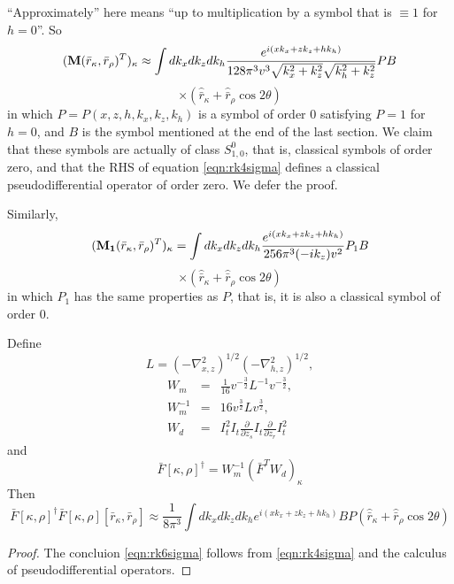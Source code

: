 ``Approximately'' here means ``up to multiplication by a symbol that
is $\equiv 1$ for $h=0$''. So 
\[
({\bf M}(\bar{r}_{\kappa},\bar{r}_{\rho})^T)_{\kappa} 
\approx \int dk_x dk_z dk_h \frac{e^{i(xk_{x}+zk_{z}+hk_{h})} }{128 \pi^3 v^3 \sqrt{k_x^2+k_z^2}\sqrt{k_h^2+k_z^2}}PB 
\]
\begin{equation}
\label{eqn:rk4sigma}
\times 
(\hat{\bar{r}}_{\kappa} + \hat{\bar{r}}_{\rho} \cos 2 \theta ) 
\end{equation}
in which $P=P(x,z,h,k_x,k_z,k_h)$ is a symbol of order 0 satisfying
$P=1$ for $h=0$, and $B$ is the symbol mentioned at the end of the
last section. We claim that these symbols are actually of class
$S^0_{1,0}$, that is, classical symbols of order zero, and that the
RHS of equation \ref{eqn:rk4sigma} defines a classical
pseudodifferential operator of order zero. We defer the proof.

Similarly,
\[
({\bf M_1}(\bar{r}_{\kappa},\bar{r}_{\rho})^T)_{\kappa} 
= \int dk_x dk_z dk_h \frac{e^{i(xk_{x}+zk_{z}+hk_{h})} }{256 \pi^3 (-ik_z)v^2}P_1B 
\]
\begin{equation}
\label{eqn:rk4sigmabis}
\times 
(\hat{\bar{r}}_{\kappa} + \hat{\bar{r}}_{\rho} \cos 2 \theta ) 
\end{equation}
in which $P_1$ has the same properties as $P$, that is, it is also a
classical symbol of order 0. 

\begin{theorem}
Define
\begin{equation}
\label{eqn:defL}
L=(-\nabla^2_{x,z})^{1/2}(-\nabla^2_{h,z})^{1/2},
\end{equation}
\begin{eqnarray}
\label{eqn:defWm}
W_m & = & \frac{1}{16}v^{-\frac{3}{2}}L^{-1}v^{-\frac{3}{2}},\\
\label{eqn:defWminv}
W_m^{-1} & = & 16 v^{\frac{3}{2}}Lv^{\frac{3}{2}},\\
\label{eqn:defWd}
W_d &=& I_t^2 I_t\frac{\partial}{\partial z_s}I_t\frac{\partial}{\partial z_r}I_t^2
\end{eqnarray}
and 
\begin{equation}
\label{eqn:rk5sigma} 
\bar{F}[\kappa,\rho]^{\dagger}  = W_m^{-1} (\bar{F}^T W_d)_{\kappa} 
\end{equation}
Then
\begin{equation}
\label{eqn:rk6sigma}
\bar{F}[\kappa,\rho]^{\dagger}\bar{F}[\kappa,\rho][\bar{r}_{\kappa},\bar{r}_{\rho}]
\approx  
\frac{1}{8 \pi^3}\int dk_x dk_z dk_h e^{i(xk_{x}+zk_{z}+hk_{h})}B P  
 (\hat{\bar{r}}_{\kappa} + \hat{\bar{r}}_{\rho} \cos 2 \theta )  
\end{equation} 
\end{theorem}
\begin{proof}
The concluion \ref{eqn:rk6sigma} follows from \ref{eqn:rk4sigma} and the calculus of 
pseudodifferential operators.
\end{proof}

